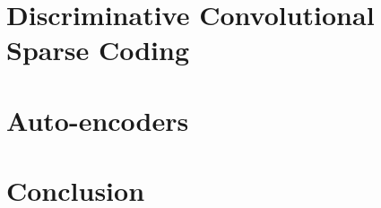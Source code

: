 \documentclass[a4paper,10pt]{report}
\begin{document}
\chapter{Discriminative Convolutional Sparse Coding}
\label{chap:SupervisedConv}


\newpage

\chapter{Auto-encoders}
\label{chap:AE}

\newpage
\chapter{Conclusion}
\label{chap:Conclusion}



\end{document}
